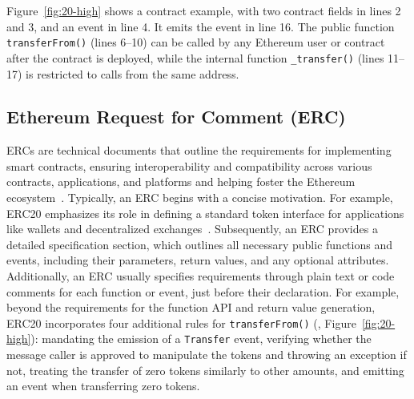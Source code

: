 Figure~\ref{fig:20-high} shows a contract example, with two contract fields in lines 2 and 3, 
and an event %
in line 4. It emits the event in line 16. The public function \texttt{transferFrom()} 
(lines 6--10) can be called by any Ethereum user or contract after the contract is deployed, while the internal function \texttt{\_transfer()} (lines 11--17) is restricted to calls from the same address.



\subsection{Ethereum Request for Comment (ERC)}
\label{sec:erc}

ERCs are technical documents that outline the requirements 
for implementing smart contracts, ensuring interoperability and 
compatibility across various contracts, applications, and platforms 
and helping foster the 
Ethereum ecosystem~\cite{erc-eip1, erc-standard, stefanovic2023proposal}. 
Typically, an ERC begins with a concise motivation. For example, ERC20 emphasizes its
role in defining a standard token interface for 
applications like wallets and decentralized exchanges~\cite{erc20}.
Subsequently, an ERC provides a detailed specification section, which
outlines all necessary public functions and events, including their parameters,
return values, and any optional attributes. Additionally, 
an ERC usually specifies requirements through plain text or code comments for each function or event, just before their declaration.
For example, 
beyond the requirements for the function API and return value generation, 
ERC20 incorporates four additional rules for \texttt{transferFrom()} 
(\eg, Figure~\ref{fig:20-high}): 
mandating the emission of a \texttt{Transfer} event, 
verifying whether the message caller is approved to manipulate 
the tokens and throwing an exception if not, 
treating the transfer of zero tokens similarly to other amounts, 
and emitting an event 
when transferring zero tokens.





